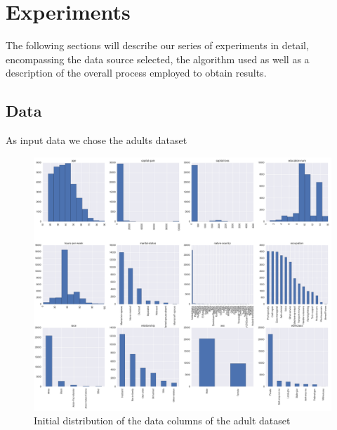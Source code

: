 \documentclass{llncs}
\begin{document}
\section{Experiments}
\label{sect:experiments}

The following sections will describe our series of experiments in detail, encompassing the data source selected, the algorithm used as well as a description of the overall process employed to obtain results.


\subsection{Data} 
\label{ssect:data}

As input data we chose the adults dataset 


\begin{figure}[H]
	\begin{center}
    \hspace*{-1cm}
		\includegraphics[width=1.2\textwidth]{figures/experiment/initial_distribution}
		\caption{Initial distribution of the data columns of the adult dataset}
		\label{fig:adult_original_distribution}
	\end{center}
\end{figure}
\end{document}

